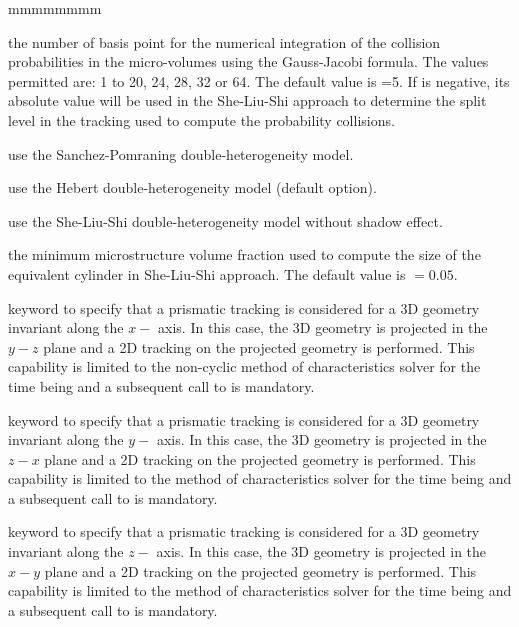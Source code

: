 \begin{ListeDeDescription}{mmmmmmmm}
\item[\dusa{iquab}] the number of basis point for the numerical integration of
the collision probabilities in the micro-volumes using the  Gauss-Jacobi
formula. The values permitted are: 1 to 20, 24, 28, 32 or  64. The default value
is =5. If  is negative, its absolute value will be used in the She-Liu-Shi approach to determine the
split level in the tracking used to compute the probability collisions.

\item[\moc{SAPO}] use the Sanchez-Pomraning double-heterogeneity model.\cite{sapo}

\item[\moc{HEBE}] use the Hebert double-heterogeneity model (default option).\cite{BIHET}

\item[\moc{SLSI}] use the She-Liu-Shi double-heterogeneity model without shadow effect.\cite{She2017}

\item[\dusa{frtm}] the minimum microstructure volume fraction used to compute the size of the equivalent cylinder in She-Liu-Shi approach. The default value is  $=0.05$.

\item[\moc{PRIX}] keyword to specify that a prismatic tracking is considered for a 3D geometry invariant along the $x-$ axis. In this case, the 3D geometry is projected in the $y-z$ plane and a 2D tracking on the projected geometry is performed. This capability is limited to the non-cyclic method of characteristics solver for the time being and a subsequent call to  is mandatory.

\item[\moc{PRIY}] keyword to specify that a prismatic tracking is considered for a 3D geometry invariant along the $y-$ axis. In this case, the 3D geometry is projected in the $z-x$ plane and a 2D tracking on the projected geometry is performed. This capability is limited to the method of characteristics solver for the time being and a subsequent call to  is mandatory.

\item[\moc{PRIZ}] keyword to specify that a prismatic tracking is considered for a 3D geometry invariant along the $z-$ axis. In this case, the 3D geometry is projected in the $x-y$ plane and a 2D tracking on the projected geometry is performed. This capability is limited to the method of characteristics solver for the time being and a subsequent call to  is mandatory.


\end{ListeDeDescription}
